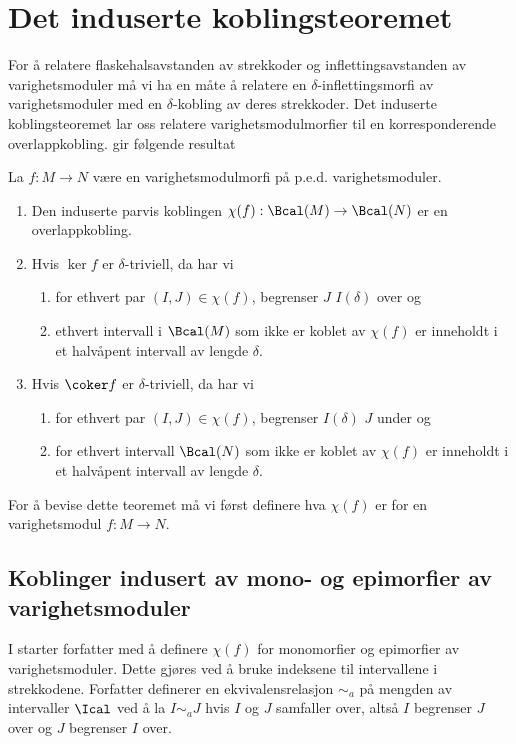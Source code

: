 \section{Det induserte koblingsteoremet}
For å relatere flaskehalsavstanden av strekkoder og
inflettingsavstanden av varighetsmoduler må vi ha en måte
å relatere en $\delta$-inflettingsmorfi av
varighetsmoduler med en $\delta$-kobling av deres
strekkoder. Det induserte koblingsteoremet lar oss
relatere varighetsmodulmorfier til en korresponderende
overlappkobling. \citep[Teorem 3.1]{Bauer2020} gir
følgende resultat

\begin{teorem}\label{trm:IKT}
  La $f: M\to N$ være en varighetsmodulmorfi på p.e.d.
  varighetsmoduler.
  \begin{enumerate}
    \item Den induserte parvis koblingen
      $\chi(f):\Bcal(M)\to\Bcal(N)$ er en overlappkobling.
    \item Hvis $\ker f$ er $\delta$-triviell, da har vi
      \begin{enumerate}
        \item for ethvert par $(I,J)\in\chi(f)$, begrenser $J$
          $I(\delta)$ over og
        \item ethvert intervall i $\Bcal(M)$ som ikke er
          koblet av $\chi(f)$ er inneholdt i et halvåpent
          intervall av lengde $\delta$.
      \end{enumerate}

    \item Hvis $\coker f$ er $\delta$-triviell, da har vi
      \begin{enumerate}
        \item for ethvert par $(I,J)\in\chi(f)$, begrenser
          $I(\delta)$ $J$ under og
        \item for ethvert intervall $\Bcal(N)$ som ikke er
          koblet av $\chi(f)$ er inneholdt i et halvåpent
          intervall av lengde $\delta$.
      \end{enumerate}
  \end{enumerate}
\end{teorem}

For å bevise dette teoremet må vi først definere hva
$\chi(f)$ er for en varighetsmodul $f: M\to N$.

\subsection{Koblinger indusert av mono- og epimorfier av
varighetsmoduler}
I \citep[seksjon 3.2]{Bauer2020} starter forfatter med
å definere $\chi(f)$ for monomorfier og epimorfier av
varighetsmoduler. Dette gjøres ved å bruke indeksene til
intervallene i strekkodene. Forfatter definerer en
ekvivalensrelasjon $\sim_a$ på mengden av intervaller
$\Ical$ ved å la $I\sim_a J$ hvis $I$ og $J$ samfaller
over, altså $I$ begrenser $J$ over og $J$ begrenser $I$
over.

